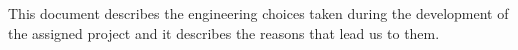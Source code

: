 %

This document describes the engineering choices taken during the development of the assigned project and it describes the reasons that lead us to them.
